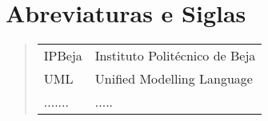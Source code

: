 \chapter{Abreviaturas e Siglas}
\begin{quote} %
\begin{tabular}[t]{p{4cm} p{10cm}}


IPBeja & Instituto Politécnico de Beja\\
UML & Unified Modelling Language\\
....... & .....



\end{tabular}

\end{quote}
